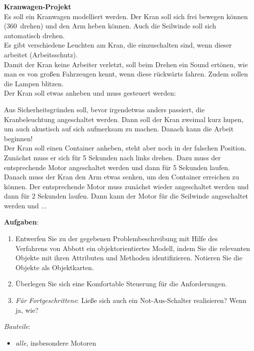 \documentclass[11pt, a4paper]{article}
\begin{document}
\textbf{{\Large Kranwagen-Projekt}}\\


Es soll ein Kranwagen modelliert werden. Der Kran soll sich frei bewegen können (360\textdegree~drehen) und den Arm heben können. Auch die Seilwinde soll sich automatisch drehen.\\

Es gibt verschiedene Leuchten am Kran, die einzuschalten sind, wenn dieser arbeitet (Arbeitsschutz).\\

Damit der Kran keine Arbeiter verletzt, soll beim Drehen ein Sound ertönen, wie man es von großen Fahrzeugen kennt, wenn diese rückwärts fahren. Zudem sollen die Lampen blitzen.\\

Der Kran soll etwas anheben und muss gesteuert werden:

\begin{mdframed}
Aus Sicherheitsgründen soll, bevor irgendetwas anders passiert, die Kranbeleuchtung angeschaltet werden. Dann soll der Kran zweimal kurz hupen, um auch akustisch auf sich aufmerksam zu machen. Danach kann die Arbeit beginnen!\\

Der Kran soll einen Container anheben, steht aber noch in der falschen Position. Zunächst muss er sich für 5 Sekunden nach links drehen. Dazu muss der entsprechende Motor angeschaltet werden und dann für 5 Sekunden laufen. Danach muss der Kran den Arm etwas senken, um den Container erreichen zu können. Der entsprechende Motor muss zunächst wieder angeschaltet werden und dann für 2 Sekunden laufen. Dann kann der Motor für die Seilwinde angeschaltet werden und ...
\end{mdframed}


\vspace{0.5cm}
\textbf{Aufgaben}:
\begin{enumerate}
\item Entwerfen Sie zu der gegebenen Problembeschreibung mit Hilfe des Verfahrens von Abbott ein objektorientiertes Modell, indem Sie die relevanten Objekte mit ihren Attributen und Methoden identifizieren. Notieren Sie die Objekte als Objektkarten.

\item Überlegen Sie sich eine Komfortable Steuerung für die Anforderungen. 

\item \emph{Für Fortgeschrittene}: Ließe sich auch ein Not-Aus-Schalter realisieren? Wenn ja, wie?
\end{enumerate}

\vfill
\emph{Bauteile}:
\begin{itemize}
\item \emph{alle}, insbesondere Motoren
\end{itemize}
\end{document}
